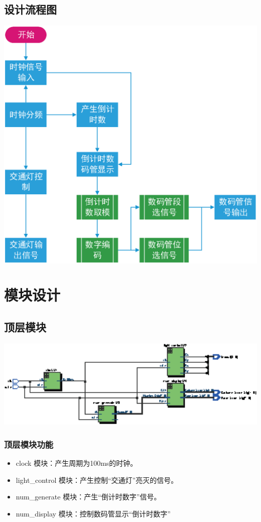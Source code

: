 \documentclass[12pt,a4paper]{article}
\begin{document}
		\subsection{设计流程图}
		\begin{center}
			\includegraphics[width=14cm]{pic/lct.eps}
		\end{center}
	\section{模块设计}
	\subsection{顶层模块}
	\begin{center}
		\includegraphics[width=16cm]{pic/pdf/top.eps}
	\end{center}
		\subsubsection{顶层模块功能}
			\begin{itemize}
				\item clock 模块：产生周期为100ms的时钟。
				\item light\_control 模块：产生控制“交通灯”亮灭的信号。
				\item num\_generate 模块：产生“倒计时数字”信号。
				\item num\_display 模块：控制数码管显示“倒计时数字”
			\end{itemize}
\end{document}
